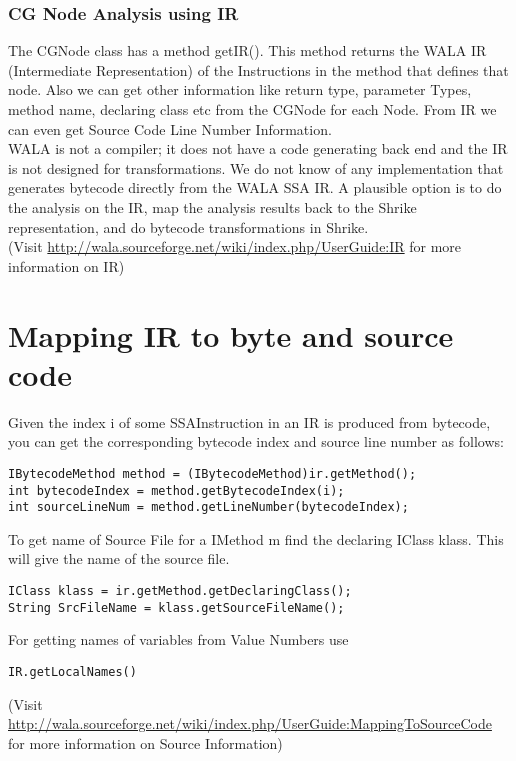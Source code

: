 \documentclass[11pt,psfig,a4]{article}
\begin{document}
\begin{flushleft}
\subsubsection{CG Node Analysis using IR}
The CGNode class has a method getIR(). This method returns the WALA IR (Intermediate Representation) of the Instructions in the method that defines that node. Also we can get other information like return type, parameter Types, method name, declaring class etc from the CGNode for each Node. From IR we can even get Source Code Line Number Information.\\
\vspace{0.5em}
WALA is not a compiler; it does not have a code generating back end and the IR is not designed for transformations. We do not know of any implementation that generates bytecode directly from the WALA SSA IR. A plausible option is to do the analysis on the IR, map the analysis results back to the Shrike representation, and do bytecode transformations in Shrike.\\
\vspace{0.5em}
(Visit \url{http://wala.sourceforge.net/wiki/index.php/UserGuide:IR} for more information on IR)
\end{flushleft}
\section{Mapping IR to byte and source code}
\begin{flushleft}
Given the index i of some SSAInstruction in an IR is produced from bytecode, you can get the corresponding bytecode index and source line number as follows:\\
\begin{lstlisting}
IBytecodeMethod method = (IBytecodeMethod)ir.getMethod();
int bytecodeIndex = method.getBytecodeIndex(i);
int sourceLineNum = method.getLineNumber(bytecodeIndex);
\end{lstlisting}
To get name of Source File for a IMethod m find the declaring IClass klass. This will give the name of the source file.\\
\begin{lstlisting}
IClass klass = ir.getMethod.getDeclaringClass();
String SrcFileName = klass.getSourceFileName();
\end{lstlisting}
For getting names of variables from Value Numbers use 
\begin{lstlisting}
IR.getLocalNames()
\end{lstlisting}
(Visit \url{http://wala.sourceforge.net/wiki/index.php/UserGuide:MappingToSourceCode} for more information on Source Information)\\
\end{flushleft}
\end{document}
